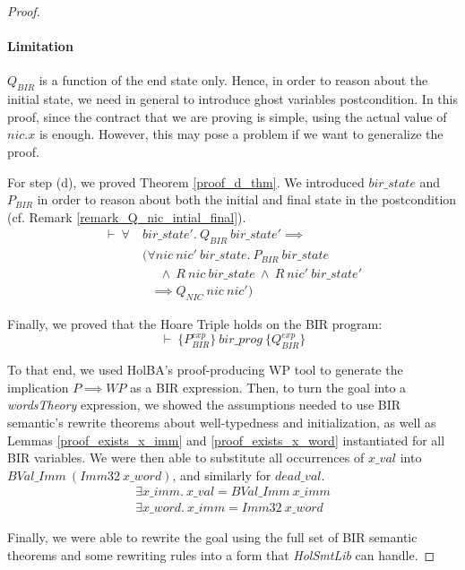\documentclass[10pt,a4paper]{article}
\newcommand{\htriple}[3]{\ensuremath{\{#1\}~#2~\{#3\}}}
\begin{document}
\begin{multicols}{2}
\begin{proof}
\paragraph{Limitation} $Q_{BIR}$ is a function of the end state only. Hence, in order to reason about the initial state, we need in general to introduce ghost variables postcondition. In this proof, since the contract that we are proving is simple, using the actual value of $nic.x$ is enough. However, this may pose a problem if we want to generalize the proof.

For step (d), we proved Theorem \ref{proof_d_thm}. We introduced $bir\_state$ and $P_{BIR}$ in order to reason about both the initial and final state in the postcondition (cf. Remark \ref{remark_Q_nic_intial_final}).
%
\begin{equation} \label{proof_d_thm}
\begin{split}
\vdash~\forall~&bir\_state'.~Q_{BIR}~bir\_state' \implies\\
	&(\forall nic~nic'~bir\_state.~P_{BIR}~bir\_state\\
	&~~~~~~\land~R~nic~bir\_state~\land~R~nic'~bir\_state'\\
	&~~~\implies Q_{NIC}~nic~nic')
\end{split}
\end{equation}

Finally, we proved that the Hoare Triple holds on the BIR program:
%
\begin{equation} \label{proof_ht_thm}
\vdash~\htriple{P^{exp}_{BIR}}{bir\_prog}{Q^{exp}_{BIR}}
\end{equation}

To that end, we used HolBA's proof-producing WP tool to generate the implication $P \implies WP$ as a BIR expression. Then, to turn the goal into a \textit{wordsTheory} expression, we showed the assumptions needed to use BIR semantic's rewrite theorems about well-typedness and initialization, as well as Lemmas \ref{proof_exists_x_imm} and \ref{proof_exists_x_word} instantiated for all BIR variables. We were then able to substitute all occurrences of $x\_val$ into $BVal\_Imm~(Imm32~x\_word)$, and similarly for $dead\_val$.
%
\begin{align}
  \label{proof_exists_x_imm}
  \exists x\_imm.~x\_val = BVal\_Imm~x\_imm\\
  \label{proof_exists_x_word}
  \exists x\_word.~x\_imm = Imm32~x\_word
\end{align}

Finally, we were able to rewrite the goal using the full set of BIR semantic theorems and some rewriting rules into a form that \textit{HolSmtLib} can handle.


\end{proof}
\end{multicols}
\end{document}

